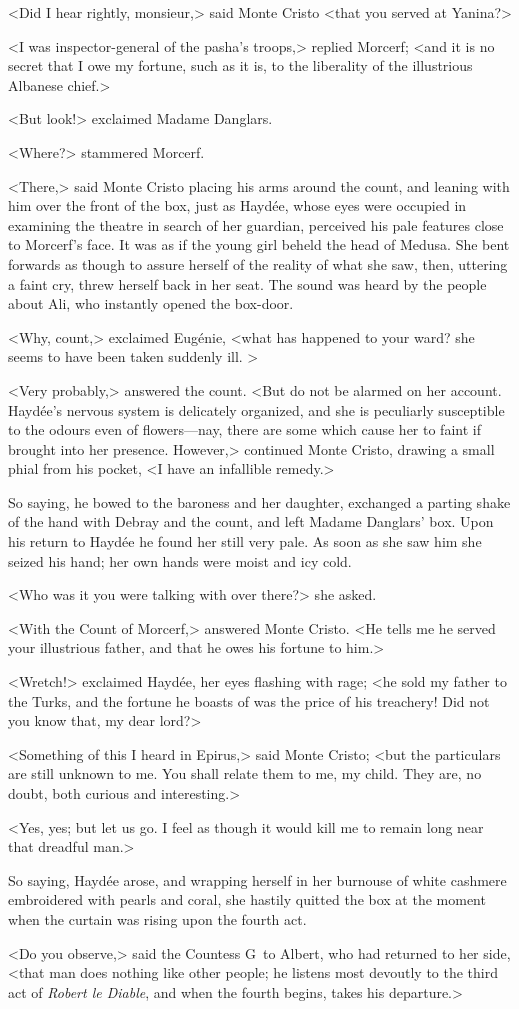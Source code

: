  <Did I hear rightly, monsieur,> said Monte Cristo <that you served at Yanina?> 

 <I was inspector-general of the pasha's troops,> replied Morcerf; <and it is no secret that I owe my fortune, such as it is, to the liberality of the illustrious Albanese chief.> 

 <But look!> exclaimed Madame Danglars. 

 <Where?> stammered Morcerf. 

 <There,> said Monte Cristo placing his arms around the count, and leaning with him over the front of the box, just as Haydée, whose eyes were occupied in examining the theatre in search of her guardian, perceived his pale features close to Morcerf's face. It was as if the young girl beheld the head of Medusa. She bent forwards as though to assure herself of the reality of what she saw, then, uttering a faint cry, threw herself back in her seat. The sound was heard by the people about Ali, who instantly opened the box-door. 

 <Why, count,> exclaimed Eugénie, <what has happened to your ward? she seems to have been taken suddenly ill. >

 <Very probably,> answered the count. <But do not be alarmed on her account. Haydée's nervous system is delicately organized, and she is peculiarly susceptible to the odours even of flowers—nay, there are some which cause her to faint if brought into her presence. However,> continued Monte Cristo, drawing a small phial from his pocket, <I have an infallible remedy.> 

 So saying, he bowed to the baroness and her daughter, exchanged a parting shake of the hand with Debray and the count, and left Madame Danglars' box. Upon his return to Haydée he found her still very pale. As soon as she saw him she seized his hand; her own hands were moist and icy cold. 

 <Who was it you were talking with over there?> she asked. 

 <With the Count of Morcerf,> answered Monte Cristo. <He tells me he served your illustrious father, and that he owes his fortune to him.> 

 <Wretch!> exclaimed Haydée, her eyes flashing with rage; <he sold my father to the Turks, and the fortune he boasts of was the price of his treachery! Did not you know that, my dear lord?> 

 <Something of this I heard in Epirus,> said Monte Cristo; <but the particulars are still unknown to me. You shall relate them to me, my child. They are, no doubt, both curious and interesting.> 

 <Yes, yes; but let us go. I feel as though it would kill me to remain long near that dreadful man.> 

 So saying, Haydée arose, and wrapping herself in her burnouse of white cashmere embroidered with pearls and coral, she hastily quitted the box at the moment when the curtain was rising upon the fourth act. 

 <Do you observe,> said the Countess G\doubleemdash~to Albert, who had returned to her side, <that man does nothing like other people; he listens most devoutly to the third act of \textit{Robert le Diable}, and when the fourth begins, takes his departure.> 
